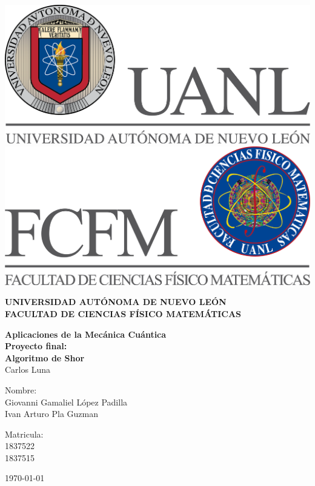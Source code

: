 \begin{titlepage}
\begin{center}
\includegraphics[scale=0.40]{../../../Logos/uanl.png} 
\hspace{2.5cm}
\includegraphics[scale=0.40]{../../../Logos/fcfm.png}
\end{center}
\vspace{4cm}
\begin{center}
\textbf{
UNIVERSIDAD AUTÓNOMA DE NUEVO LEÓN\\
FACULTAD DE CIENCIAS
FÍSICO MATEMÁTICAS}\\
\vspace*{1cm}
\begin{large}
\large{\textbf{Aplicaciones de la Mecánica Cuántica}}\\
\textbf{Proyecto final:\\ Algoritmo de Shor}\\
Carlos Luna\\
\end{large}
\vspace{3.5cm}
\begin{minipage}{0.6\linewidth}
\vspace{1cm}
\changefontsizes{14pt}
Nombre:\\
Giovanni Gamaliel López Padilla\\
Ivan Arturo Pla Guzman\\
\end{minipage}
\begin{minipage}{0.2\linewidth}
\changefontsizes{14pt}
Matricula:\\
1837522\\
1837515
\end{minipage}
\end{center}
\vspace{4cm}
\begin{flushright}
\today
\end{flushright}
\pagebreak
\end{titlepage}